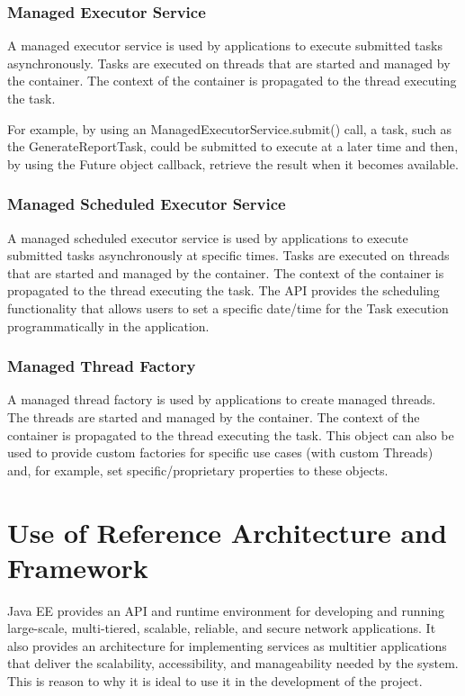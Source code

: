 \documentclass[12pt]{article}
\begin{document}
\subsubsection{Managed Executor Service}
A managed executor service is used by applications to execute submitted tasks asynchronously. Tasks are executed on threads that are
started and managed by the container. The context of the container is propagated to the thread executing the task.

For example, by using an ManagedExecutorService.submit() call, a task, such as the GenerateReportTask, could be submitted to execute at a later time and then, by using the Future object callback, retrieve the result when it becomes available.

\subsubsection{Managed Scheduled Executor Service}
A managed scheduled executor service is used by applications to execute submitted tasks asynchronously at specific times. Tasks are executed on threads that are started and managed by the container. The context of the container is propagated to the thread executing the task. The API
provides the scheduling functionality that allows users to set a specific date/time for the Task execution programmatically in the application.

\subsubsection{Managed Thread Factory}
A managed thread factory is used by applications to create managed threads. The threads are started and managed by the container. The context of the container is propagated to the thread executing the task. This object can also be used to provide custom factories for specific use cases (with custom Threads) and, for example, set specific/proprietary properties to these objects.


\section{Use of Reference Architecture and Framework}
Java EE provides an API and runtime environment for developing and running large-scale, multi-tiered, scalable, reliable, and secure network applications. It also provides an architecture for implementing services as multitier applications that deliver the scalability, accessibility, and manageability needed by the system. This is reason to why it is ideal to use it in the development of the project.
\end{document}
